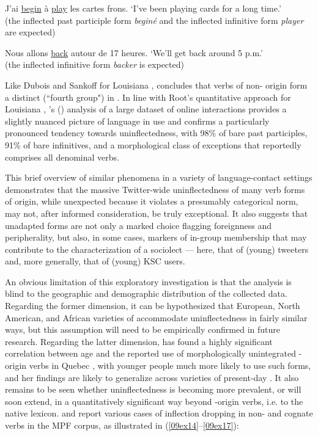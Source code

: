 \documentclass[output=paper,colorlinks,citecolor=brown]{langscibook}
\begin{document}
\begin{exe}
	\ex \label{09ex12} J'ai \ul{begin} à \ul{play} les cartes frons.
	\trans ‘I've been playing cards for a long time.’ \\
	(the inflected past participle form \emph{beginé} and the inflected infinitive form \emph{player} are expected)
	
	\ex \label{09ex13} Nous allons \ul{back} autour de 17 heures.
	\trans ‘We'll get back around 5 p.m.’ \\
	(the inflected infinitive form \emph{backer} is expected)
\end{exe}

Like Dubois and Sankoff for Louisiana , \citet{bogni2018} concludes that verbs of non- origin form a distinct (``fourth group")  in . In line with Root's quantitative approach for Louisiana , \citeauthor{nchare2010}'s (\citeyear{nchare2010}) analysis of a large dataset of online  interactions provides a slightly nuanced picture of language in use and confirms a particularly pronounced tendency towards uninflectedness, with 98\% of bare past participles, 91\% of bare infinitives, and a morphological class of exceptions that reportedly comprises all denominal verbs.

This brief overview of similar phenomena in a variety of language-contact settings demonstrates that the massive Twitter-wide uninflectedness of many  verb forms of  origin, while unexpected because it violates a presumably categorical norm, may not, after informed consideration, be truly exceptional. It also suggests that unadapted forms are not only a marked choice flagging foreignness and peripherality, but also, in some cases, markers of in-group membership that may contribute to the characterization of a sociolect --- here, that of (young) tweeters and, more generally, that of (young) KSC users.

An obvious limitation of this exploratory investigation is that the analysis is blind to the geographic and demographic distribution of the collected data. Regarding the former dimension, it can be hypothesized that European, North American, and African varieties of  accommodate uninflectedness in fairly similar ways, but this assumption will need to be empirically confirmed in future research. Regarding the latter dimension, \citet{bouchard2023} has found a highly significant correlation between age and the reported use of morphologically unintegrated -origin verbs in Quebec , with younger people much more likely to use such forms, and her findings are likely to generalize across varieties of present-day . It also remains to be seen whether uninflectedness is becoming more prevalent, or will soon extend, in a quantitatively significant way beyond -origin verbs, i.e. to the native lexicon. \citet[79]{cappeaumoreno2017} and \citet[737]{gadethambye2018} report various cases of inflection dropping in non- and cognate verbs in the MPF corpus, as illustrated in (\ref{09ex14}--\ref{09ex17}):
\end{document}
